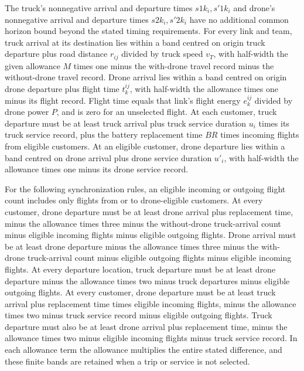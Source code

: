 \documentclass[10pt]{article}
\begin{document}
The truck's nonnegative arrival and departure times $s1k_i,s'1k_{i}$ and drone's nonnegative arrival and departure times $s2k_i,s'2k_{i}$ have no additional common horizon bound beyond the stated timing requirements. For every link and team, truck arrival at its destination lies within a band centred on origin truck departure plus road distance $r_{ij}$ divided by truck speed $v_T$, with half-width the given allowance $M$ times one minus the with-drone travel record minus the without-drone travel record. Drone arrival lies within a band centred on origin drone departure plus flight time $t_k^{ij}$, with half-width the allowance times one minus its flight record. Flight time equals that link's flight energy $e_k^{ij}$ divided by drone power $P$, and is zero for an unselected flight. At each customer, truck departure must be at least truck arrival plus truck service duration $u_i$ times its truck service record, plus the battery replacement time $BR$ times incoming flights from eligible customers. At an eligible customer, drone departure lies within a band centred on drone arrival plus drone service duration $u'_i$, with half-width the allowance times one minus its drone service record.

For the following synchronization rules, an eligible incoming or outgoing flight count includes only flights from or to drone-eligible customers. At every customer, drone departure must be at least drone arrival plus replacement time, minus the allowance times three minus the without-drone truck-arrival count minus eligible incoming flights minus eligible outgoing flights. Drone arrival must be at least drone departure minus the allowance times three minus the with-drone truck-arrival count minus eligible outgoing flights minus eligible incoming flights. At every departure location, truck departure must be at least drone departure minus the allowance times two minus truck departures minus eligible outgoing flights. At every customer, drone departure must be at least truck arrival plus replacement time times eligible incoming flights, minus the allowance times two minus truck service record minus eligible outgoing flights. Truck departure must also be at least drone arrival plus replacement time, minus the allowance times two minus eligible incoming flights minus truck service record. In each allowance term the allowance multiplies the entire stated difference, and these finite bands are retained when a trip or service is not selected.
\end{document}
